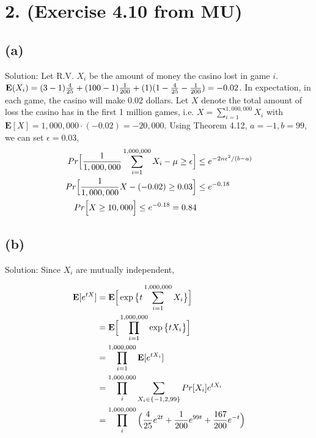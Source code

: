 \documentclass[11pt]{537homework}
\author{Peilun Dai}
\begin{document}
\section*{2. (Exercise 4.10 from MU) }



\subsection*{(a)} 

Solution: Let R.V. $X_i$ be the amount of money the casino lost in game $i$. $\mathbf{E}(X_i) = (3-1){4 \over 25} + (100-1){1\over 200} + (1)(1 - {4 \over 25} - {1 \over 200}) = -0.02$. In expectation, in each game, the casino will make $0.02$ dollars. Let $X$ denote the total amount of loss the casino has in the first 1 million games, i.e. $X = \sum_{i=1}^{1,000,000} X_i$ with $\mathbf{E}[X] = 1,000,000\cdot(-0.02) = -20,000$. Using Theorem 4.12, $a = -1, b=99$, we can set $\epsilon = 0.03$, 
\begin{align}
  Pr\Big[ {1\over 1,000,000} \sum_{i=1}^{1,000,000} X_i - \mu \geq \epsilon\Big] & \leq e^{-2n\epsilon^2/(b-a)} \\
  Pr\Big[  {1\over 1,000,000} X - (-0.02)   \geq 0.03 \Big] & \leq e^{-0.18} \\
  Pr\Big[ X \geq 10,000 \Big] \leq e^{-0.18} = 0.84\\
\end{align}



\subsection*{(b)} 

Solution: Since $X_i$ are mutually independent,

\begin{align}
  \mathbf{E}[e^{tX}]      & = \mathbf{E}\Big[\exp \big\{t\sum_{i=1}^{1,000,000} X_i\big\}\Big] \\
                          & = \mathbf{E}\Big[\prod_{i=1}^{1,000,000}\exp \big\{tX_i\big\}\Big]\\
                          & = \prod_{i=1}^{1,000,000}\mathbf{E}[e^{tX_i}] \\
                          & = \prod_{i}^{1,000,000}\sum_{X_i \in \{-1, 2, 99\}} Pr[X_i]e^{tX_i} \\
                          & = \prod_{i}^{1,000,000}\Big( {4 \over 25}e^{2t} + {1 \over 200}e^{99t} + {167 \over 200}e^{-t}\Big)
\end{align}
\end{document}
